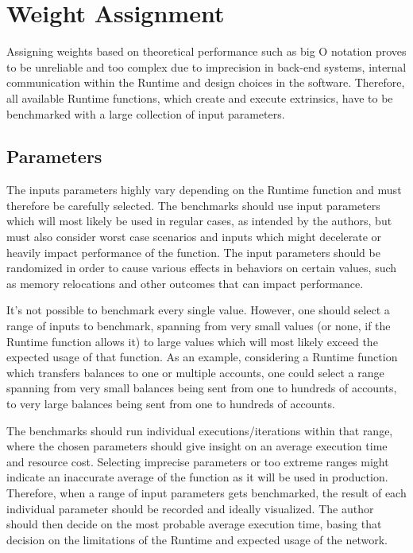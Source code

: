 \documentclass[11pt,a4paper]{article}
\begin{document}
\section{Weight Assignment}
Assigning weights based on theoretical performance such as big O notation proves to be
unreliable and too complex due to imprecision in back-end systems, internal communication
within the Runtime and design choices in the software. Therefore, all available Runtime 
functions, which create and execute extrinsics, have to be benchmarked with a large
collection of input parameters.

\subsection{Parameters}
The inputs parameters highly vary depending on the Runtime function and must therefore
be carefully selected. The benchmarks should use input parameters which will most likely be
used in regular cases, as intended by the authors, but must also consider worst case
scenarios and inputs which might decelerate or heavily impact performance of the function.
The input parameters should be randomized in order to cause various effects in behaviors
on certain values, such as memory relocations and other outcomes that can impact performance.
\newline

It's not possible to benchmark every single value. However, one should select a range
of inputs to benchmark, spanning from very small values (or none, if the Runtime function
allows it) to large values which will most likely exceed the expected usage of that function.
As an example, considering a Runtime function which transfers balances to one or multiple
accounts, one could select a range spanning from very small balances being sent from one to
hundreds of accounts, to very large balances being sent from one to hundreds of accounts.
\newline

The benchmarks should run individual executions/iterations within that range, where the chosen parameters
should give insight on an average execution time and resource cost. Selecting imprecise parameters
or too extreme ranges might indicate an inaccurate average of the function as it will be used in production.
Therefore, when a range of input parameters gets benchmarked, the result of each individual parameter
should be recorded and ideally visualized. The author should then decide on the most probable average
execution time, basing that decision on the limitations of the Runtime and expected usage of the network.
\newline
\end{document}
